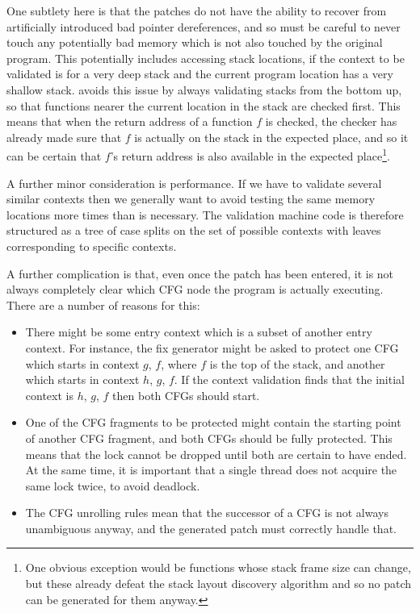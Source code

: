 One subtlety here is that the patches do not have the ability to
recover from artificially introduced bad pointer dereferences, and so
must be careful to never touch any potentially bad memory which is not
also touched by the original program.  This potentially includes
accessing stack locations, if the context to be validated is for a
very deep stack and the current program location has a very shallow
stack.  {\Technique} avoids this issue by always validating stacks
from the bottom up, so that functions nearer the current location in
the stack are checked first.  This means that when the return address
of a function $f$ is checked, the checker has already made sure that
$f$ is actually on the stack in the expected place, and so it can be
certain that $f$'s return address is also available in the expected
place\footnote{One obvious exception would be functions whose stack
  frame size can change, but these already defeat the stack layout
  discovery algorithm and so no patch can be generated for them
  anyway.}.

A further minor consideration is performance.  If we have to validate
several similar contexts then we generally want to avoid testing the
same memory locations more times than is necessary.  The validation
machine code is therefore structured as a tree of case splits on the
set of possible contexts with leaves corresponding to specific
contexts.

A further complication is that, even once the patch has been entered,
it is not always completely clear which CFG node the program is
actually executing.  There are a number of reasons for this:

\begin{itemize}
\item
  There might be some entry context which is a subset of another entry
  context.  For instance, the fix generator might be asked to protect
  one CFG which starts in context $g$, $f$, where $f$ is the top of
  the stack, and another which starts in context $h$, $g$, $f$.  If
  the context validation finds that the initial context is $h$, $g$,
  $f$ then both CFGs should start.
\item
  One of the CFG fragments to be protected might contain the starting
  point of another CFG fragment, and both CFGs should be fully
  protected.  This means that the lock cannot be dropped until both
  are certain to have ended.  At the same time, it is important that a
  single thread does not acquire the same lock twice, to avoid
  deadlock.
\item
  The CFG unrolling rules mean that the successor of a CFG is not
  always unambiguous anyway, and the generated patch must correctly
  handle that.
\end{itemize}

